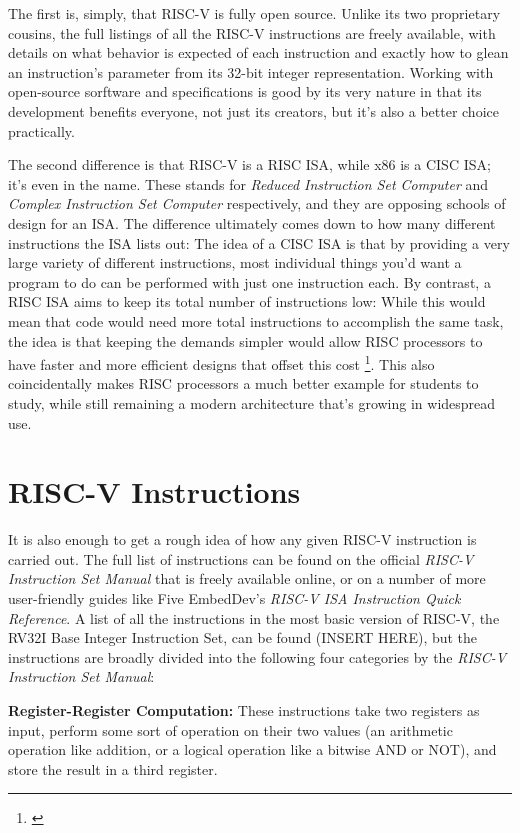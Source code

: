 \documentclass[12pt,twoside]{reedthesis}
\begin{document}
The first is, simply, that RISC-V is fully open source. Unlike its two proprietary cousins, the full listings of all the RISC-V instructions are freely available, with details on what behavior is expected of each instruction and exactly how to glean an instruction's parameter from its 32-bit integer representation. Working with open-source sorftware and specifications is good by its very nature in that its development benefits everyone, not just its creators, but it's also a better choice practically.

The second difference is that RISC-V is a RISC ISA, while x86 is a CISC ISA; it's even in the name. These stands for \textit{Reduced Instruction Set Computer} and \textit{Complex Instruction Set Computer} respectively, and they are opposing schools of design for an ISA. The difference ultimately comes down to how many different instructions the ISA lists out: The idea of a CISC ISA is that by providing a very large variety of different instructions, most individual things you'd want a program to do can be performed with just one instruction each. By contrast, a RISC ISA aims to keep its total number of instructions low: While this would mean that code would need more total instructions to accomplish the same task, the idea is that keeping the demands simpler would allow RISC processors to have faster and more efficient designs that offset this cost \footnote{\cite{denning}}. This also coincidentally makes RISC processors a much better example for students to study, while still remaining a modern architecture that's growing in widespread use.


\section{RISC-V Instructions}

It is also enough to get a rough idea of how any given RISC-V instruction is carried out. The full list of instructions can be found on the official \textit{RISC-V Instruction Set Manual} that is freely available online, or on a number of more user-friendly guides like Five EmbedDev's \textit{RISC-V ISA Instruction Quick Reference}. A list of all the instructions in the most basic version of RISC-V, the RV32I Base Integer Instruction Set, can be found (INSERT HERE), but the instructions are broadly divided into the following four categories by the \textit{RISC-V Instruction Set Manual}:


\textbf{Register-Register Computation:} These instructions take two registers as input, perform some sort of operation on their two values (an arithmetic operation like addition, or a logical operation like a bitwise AND or NOT), and store the result in a third register.
\end{document}
